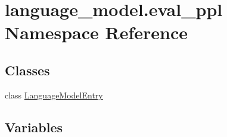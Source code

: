 \hypertarget{namespacelanguage__model_1_1eval__ppl}{}\section{language\+\_\+model.\+eval\+\_\+ppl Namespace Reference}
\label{namespacelanguage__model_1_1eval__ppl}
\subsection*{Classes}
\begin{DoxyCompactItemize}
\item 
class \hyperlink{classlanguage__model_1_1eval__ppl_1_1LanguageModelEntry}{Language\+Model\+Entry}
\end{DoxyCompactItemize}
\subsection*{Variables}
